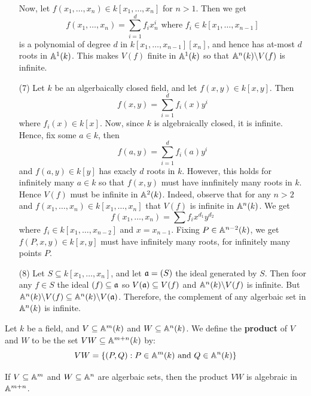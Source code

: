 \begin{example}
\begin{enumerate}
      Now, let $f(x_1, \dots, x_n) \in k[x_1, \dots, x_n]$ for $n>1$.
      Then we get
      \begin{equation*}
        f(x_1, \dots, x_n)=\sum_{i=1}^d{f_ix_n^i} \text{ where }
        f_i \in k[x_1, \dots, x_{n-1}]
      \end{equation*}
      is a polynomial of degree $d$ in $k[x_1, \dots, x_{n-1}][x_n]$,
      and hence has at-most $d$ roots in $\mathbb{A}^1(k)$. This makes $V(f)$
      finite in $\mathbb{A}^1(k)$ so that $\mathbb{A}^n(k) \backslash V(f)$ is infinite.

    \item[(7)] Let $k$ be an algerbaically closed field, and let
      $f(x,y) \in k[x,y]$. Then
      \begin{equation*}
        f(x,y)=\sum_{i=1}^d{f_i(x)y^i}
      \end{equation*}
      where $f_i(x) \in k[x]$. Now, since $k$ is algebraically closed,
      it is infinite. Hence, fix some $a \in k$, then
      \begin{equation*}
        f(a,y)=\sum_{i=1}^d{f_i(a)y^i}
      \end{equation*}
      and $f(a,y) \in k[y]$ has exacly $d$ roots in $k$. However, this
      holds for infinitely many $a \in k$ so that $f(x,y)$ must have
      innfinitely many roots in $k$. Hence $V(f)$ must be infinite in
      $\mathbb{A}^2(k)$. Indeed, observe that for any $n>2$ and $f(x_1, \dots,
      x_n) \in k[x_1, \dots, x_n]$ that $V(f)$ is infinite in
      $\mathbb{A}^n(k)$. We get
      \begin{equation*}
        f(x_1, \dots, x_n)=\sum{f_ix^{d_1}y^{d_2}}
      \end{equation*}
      where $f_i \in k[x_1, \dots, x_{n-2}]$ and $x=x_{n-1}$. Fixing
      $P \in \mathbb{A}^{n-2}(k)$, we get $f(P,x,y) \in k[x,y]$ must have
      infinitely many roots, for infinitely many points $P$.

    \item[(8)] Let $S \subseteq k[x_1, \dots, x_n]$, and let $\mathfrak{a}=(S)$
      the ideal generated by $S$. Then foor any $f \in S$ the ideal
      $(f) \subseteq \mathfrak{a}$ so $V(\mathfrak{a}) \subseteq V(f)$ and
      $\mathbb{A}^n(k) \backslash V(f)$ is infinite. But $\mathbb{A}^n(k) \backslash V(f)
      \subseteq \mathbb{A}^n(k) \backslash V(\mathfrak{a})$. Therefore, the complement of
      any algerbaic set in $\mathbb{A}^n(k)$ is infinite.
  \end{enumerate}
\end{example}

\begin{defintion}
  Let $k$ be a field, and $V \subseteq \mathbb{A}^m(k)$ and $W \subseteq
  \mathbb{A}^n(k)$. We define the \textbf{product} of $V$ and $W$ to be the
  set $VW \subseteq \mathbb{A}^{m+n}(k)$ by:
  \begin{equation*}
    VW=\{(P,Q) : P \in \mathbb{A}^m(k) \text{ and } Q \in \mathbb{A}^n(k)\}
  \end{equation*}
\end{defintion}

\begin{proposition}\label{proposition_10.1.4}
  If $V \subseteq \mathbb{A}^m$ and $W \subseteq \mathbb{A}^n$ are algerbaic sets,
  then the product $VW$ is algebraic in $\mathbb{A}^{m+n}$.
\end{proposition}
